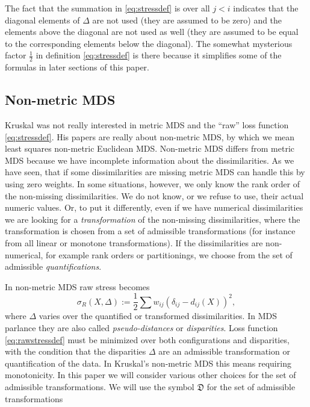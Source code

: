\documentclass[
  12pt,
]{article}
\begin{document}
The fact that the summation in \eqref{eq:stressdef} is over all \(j<i\)
indicates that the diagonal elements of \(\Delta\) are not used (they are
assumed to be zero) and the elements above the diagonal are not used as
well (they are assumed to be equal to the corresponding elements below
the diagonal). The somewhat mysterious factor \(\frac12\) in definition
\eqref{eq:stressdef} is there because it simplifies some of the formulas
in later sections of this paper.

\subsection{Non-metric MDS}\label{non-metric-mds}

Kruskal was not really interested in metric MDS and the ``raw'' loss
function \eqref{eq:stressdef}. His papers are really about non-metric
MDS, by which we mean least squares non-metric Euclidean MDS. Non-metric
MDS differs from metric MDS because we have incomplete information about
the dissimilarities. As we have seen, that if some dissimilarities are
missing metric MDS can handle this by using zero weights. In some
situations, however, we only know the rank order of the non-missing
dissimilarities. We do not know, or we refuse to use, their actual
numeric values. Or, to put it differently, even if we have numerical
dissimilarities we are looking for a \emph{transformation} of the non-missing
dissimilarities, where the transformation is chosen from a set of
admissible transformations (for instance from all linear or monotone
transformations). If the dissimilarities are non-numerical, for example
rank orders or partitionings, we choose from the set of admissible
\emph{quantifications}.

In non-metric MDS raw stress becomes
\begin{equation}
\sigma_R(X,\Delta):=\frac12\sum w_{ij}(\delta_{ij}-d_{ij}(X))^2,
\label{eq:rawstressdef}
\end{equation}
where \(\Delta\) varies over the quantified or transformed
dissimilarities. In MDS parlance they are also called \emph{pseudo-distances}
or \emph{disparities}. Loss function \eqref{eq:rawstressdef} must be minimized
over both configurations and disparities, with the condition that the
disparities \(\Delta\) are an admissible transformation or quantification
of the data. In Kruskal's non-metric MDS this means
requiring monotonicity. In this paper we will consider various other
choices for the set of admissible transformations. We will use the
symbol \(\mathfrak{D}\) for the set of admissible transformations
\end{document}
